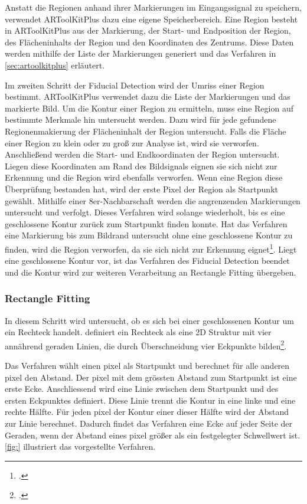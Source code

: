 Anstatt die Regionen anhand ihrer Markierungen im Eingangssignal zu speichern, verwendet ARToolKitPlus dazu eine eigene
 Speicherbereich. Eine Region besteht in ARToolKitPlus aus der Markierung, der Start- und Endposition der Region, des
 Flächeninhalts der Region und den Koordinaten des Zentrums. Diese Daten werden mithilfe der Liste der Markierungen
 generiert und das Verfahren in \autoref{sec:artoolkitplus} erläutert.

Im zweiten Schritt der Fiducial Detection wird der Umriss einer Region bestimmt. ARToolKitPlus verwendet dazu die Liste
 der Markierungen und das markierte Bild. Um die Kontur einer Region zu ermitteln, muss eine Region auf bestimmte
 Merkmale hin untersucht werden. Dazu wird für jede gefundene Regionenmakierung der Flächeninhalt der Region
 untersucht. Falls die Fläche einer Region zu klein oder zu groß zur Analyse ist, wird sie verworfen. Anschließend
 werden die Start- und Endkoordinaten der Region untersucht. Liegen diese Koordinaten am Rand des Bildsignals eignen
 sie sich nicht zur Erkennung und die Region wird ebenfalls verworfen. Wenn eine Region diese Überprüfung bestanden
 hat, wird der erste Pixel der Region als Startpunkt gewählt. Mithilfe einer 8er-Nachbarschaft werden die angrenzenden
 Markierungen untersucht und verfolgt. Dieses Verfahren wird solange wiederholt, bis es eine geschlossene Kontur zurück
 zum Startpunkt finden konnte. Hat das Verfahren eine Markierung bis zum Bildrand untersucht ohne eine geschlossene
 Kontur zu finden, wird die Region verworfen, da sie sich nicht zur Erkennung
 eignet\footcite[Vgl.][S.~41--42]{wagner07a}. Liegt eine geschlossene Kontur vor, ist das Verfahren des Fiducial
 Detection beendet und die Kontur wird zur weiteren Verarbeitung an Rectangle Fitting übergeben.


\subsubsection{Rectangle Fitting} %
\label{sub:rectangle_fitting}

In diesem Schritt wird untersucht, ob es sich bei einer geschlossenen Kontur um ein Rechteck handelt.
 \citeauthor{wagner07a} definiert ein Rechteck als eine 2D Struktur mit vier annährend geraden Linien, die durch
 Überschneidung vier Eckpunkte bilden\footcite[Vgl.][S.~42]{wagner07a}.

Das Verfahren wählt einen \gls{pixel} als Startpunkt und berechnet für alle anderen \gls{pixel} den Abstand. Der
 \gls{pixel} mit dem grössten Abstand zum Startpunkt ist eine erste Ecke. Anschliessend wird eine Linie zwischen dem
 Startpunkt und des ersten Eckpunktes definiert. Diese Linie trennt die Kontur in eine linke und eine rechte Hälfte.
 Für jeden \gls{pixel} der Kontur einer dieser Hälfte wird der Abstand zur Linie berechnet. Dadurch findet das
 Verfahren eine Ecke auf jeder Seite der Geraden, wenn der Abstand eines \gls{pixel} größer als ein festgelegter
 Schwellwert ist. \autoref{fig:} illustriert das vorgestellte Verfahren.

